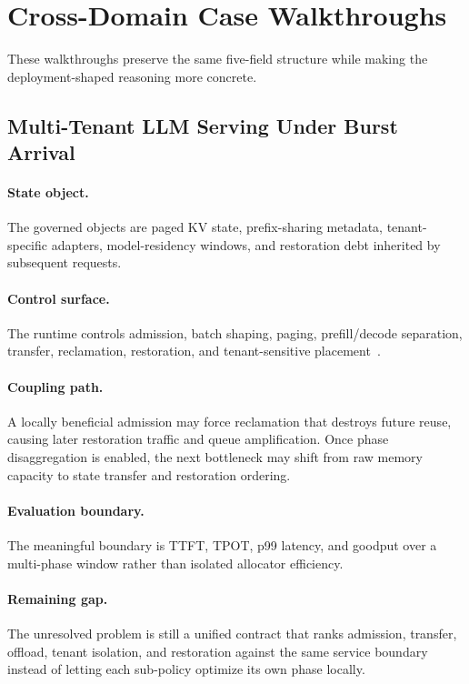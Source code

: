 \section{Cross-Domain Case Walkthroughs}

These walkthroughs preserve the same five-field structure while making the deployment-shaped reasoning more concrete.

\subsection{Multi-Tenant LLM Serving Under Burst Arrival}

\paragraph{State object.}
The governed objects are paged KV state, prefix-sharing metadata, tenant-specific adapters, model-residency windows, and restoration debt inherited by subsequent requests.

\paragraph{Control surface.}
The runtime controls admission, batch shaping, paging, prefill/decode separation, transfer, reclamation, restoration, and tenant-sensitive placement~\cite{kwon2023pagedattention,agrawal2024sarathi,zhong2024distserve,patel2024splitwise,chen2024punica,nian2026cacheflow}.

\paragraph{Coupling path.}
A locally beneficial admission may force reclamation that destroys future reuse, causing later restoration traffic and queue amplification. Once phase disaggregation is enabled, the next bottleneck may shift from raw memory capacity to state transfer and restoration ordering.

\paragraph{Evaluation boundary.}
The meaningful boundary is TTFT, TPOT, p99 latency, and goodput over a multi-phase window rather than isolated allocator efficiency.

\paragraph{Remaining gap.}
The unresolved problem is still a unified contract that ranks admission, transfer, offload, tenant isolation, and restoration against the same service boundary instead of letting each sub-policy optimize its own phase locally.

